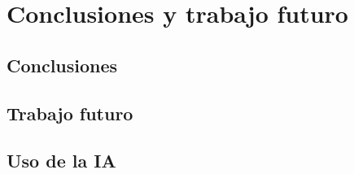 \documentclass[oneside,12pt]{book}
\begin{document}


\chapter{Conclusiones y trabajo futuro}
\section{Conclusiones}



\section{Trabajo futuro}



\section{Uso de la IA}



\vspace{1cm}










\printglossaries
\end{document}

